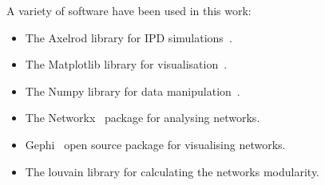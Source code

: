 \documentclass{article}
\theoremstyle{definition}
\begin{document}
A variety of software have been used in this work:

\begin{itemize}
    \item The Axelrod library for IPD simulations~\cite{axelrodproject}.
    \item The Matplotlib library for visualisation~\cite{hunter2007matplotlib}.
    \item The Numpy library for data manipulation~\cite{walt2011numpy}.
    \item The Networkx~\cite{networkx} package for analysing networks.
    \item Gephi~\cite{ICWSM09154} open source package for visualising networks.
    \item The louvain library for calculating the networks modularity.
\end{itemize}

\newpage


\end{document}
